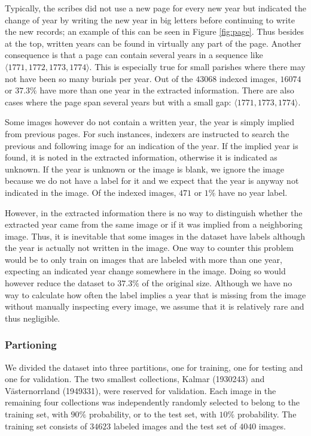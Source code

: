 Typically, the scribes did not use a new page for every new year but indicated the change of year by writing the new year in big letters before continuing to write the new records; an example of this can be seen in Figure \ref{fig:page}.
Thus besides at the top, written years can be found in virtually any part of the page. Another consequence is that a page can contain several years in a sequence like $\langle 1771, 1772, 1773, 1774 \rangle$. This is especially true for small parishes where there may not have been so many burials per year. Out of the $43068$ indexed images, $16074$ or $37.3\%$ have more than one year in the extracted information. There are also cases where the page span several years but with a small gap: $\langle 1771, 1773, 1774 \rangle$.

Some images however do not contain a written year, the year is simply implied from previous pages. For such instances, indexers are instructed to search the previous and following image for an indication of the year. If the implied year is found, it is noted in the extracted information, otherwise it is indicated as unknown.
If the year is unknown or the image is blank, we ignore the image because we do not have a label for it and we expect that the year is anyway not indicated in the image. Of the indexed images, $471$ or $1\%$ have no year label.

However, in the extracted information there is no way to distinguish whether the extracted year came from the same image or if it was implied from a neighboring image. Thus, it is inevitable that some images in the dataset have labels although the year is actually not written in the image. One way to counter this problem would be to only train on images that are labeled with more than one year, expecting an indicated year change somewhere in the image. Doing so would however reduce the dataset to $37.3\%$ of the original size.
Although we have no way to calculate how often the label implies a year that is missing from the image without manually inspecting every image, we assume that it is relatively rare and thus negligible.

\subsubsection{Partioning}

We divided the dataset into three partitions, one for training, one for testing and one for validation. The two smallest collections, Kalmar (1930243) and Västernorrland (1949331), were reserved for validation.
Each image in the remaining four collections was independently randomly selected to belong to the training set, with $90\%$ probability, or to the test set, with $10\%$ probability.
The training set consists of $34623$ labeled images and the test set of $4040$ images.

